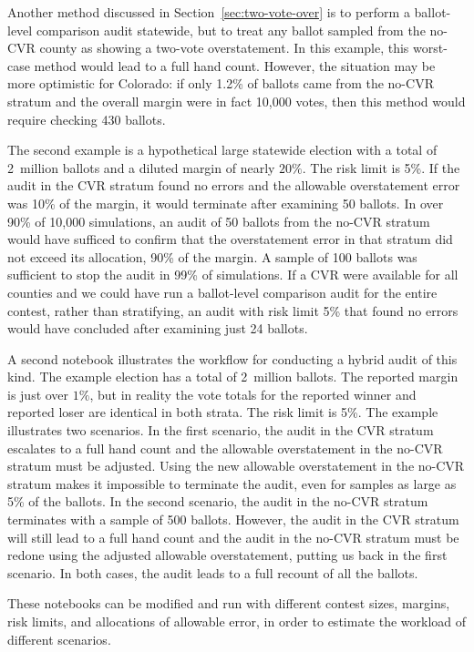 \documentclass[12pt]{article}
\begin{document}
Another method discussed in Section~\ref{sec:two-vote-over} is to perform a ballot-level comparison audit statewide,
but to treat any ballot sampled from the no-CVR county as showing a two-vote overstatement.
In this example, this worst-case method would lead to a full hand count.
However, the situation may be more optimistic for Colorado:
if only 1.2\% of ballots came from the no-CVR stratum and the overall margin were in fact 10,000 votes,
then this method would require checking 430 ballots.

The second example is a hypothetical large statewide election with a total of 
2~million ballots and a diluted margin of nearly $20\%$.  The risk limit is 5\%.
If the audit in the CVR stratum found no errors and the allowable overstatement error was 10\% of the margin, 
it would terminate after examining 50 ballots.
In over 90\% of 10,000 simulations, an audit of 50 ballots from the no-CVR stratum
would have sufficed to confirm that the overstatement error in that stratum
did not exceed its allocation, 90\% of the margin.
A sample of 100 ballots was sufficient to stop the audit in 99\% of simulations.
If a CVR were available for all counties and we could have run a ballot-level comparison audit for the entire contest, 
rather than stratifying, an audit with risk limit 5\% that found no errors would have concluded after examining just 24 ballots.

A second notebook illustrates the workflow for conducting a hybrid audit of this kind.
The example election has a total of 2~million ballots.
The reported margin is just over $1\%$, but in reality the vote totals for the reported winner
and reported loser are identical in both strata.  The risk limit is 5\%.
The example illustrates two scenarios.
In the first scenario, the audit in the CVR stratum escalates to a full hand count and the allowable overstatement
in the no-CVR stratum must be adjusted.
Using the new allowable overstatement in the no-CVR stratum makes it impossible to terminate the audit,
even for samples as large as 5\% of the ballots.
In the second scenario, the audit in the no-CVR stratum terminates with a sample of 500 ballots.
However, the audit in the CVR stratum will still lead to a full hand count and the audit in the no-CVR
stratum must be redone using the adjusted allowable overstatement, putting us back in the first scenario.
In both cases, the audit leads to a full recount of all the ballots.

These notebooks can be modified and run with different contest sizes, margins, risk limits, and allocations of allowable error, in order to
estimate the workload of different scenarios.


\end{document}
